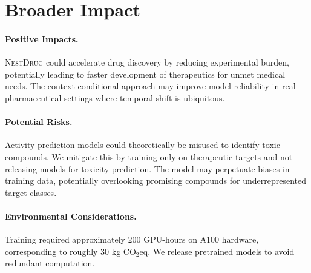\documentclass{article}
\newcommand{\methodname}{\textsc{NestDrug}}
\begin{document}
\section{Broader Impact}
\label{app:impact}

\paragraph{Positive Impacts.} \methodname{} could accelerate drug discovery by reducing experimental burden, potentially leading to faster development of therapeutics for unmet medical needs. The context-conditional approach may improve model reliability in real pharmaceutical settings where temporal shift is ubiquitous.

\paragraph{Potential Risks.} Activity prediction models could theoretically be misused to identify toxic compounds. We mitigate this by training only on therapeutic targets and not releasing models for toxicity prediction. The model may perpetuate biases in training data, potentially overlooking promising compounds for underrepresented target classes.

\paragraph{Environmental Considerations.} Training required approximately 200 GPU-hours on A100 hardware, corresponding to roughly 30 kg CO$_2$eq. We release pretrained models to avoid redundant computation.
\end{document}
